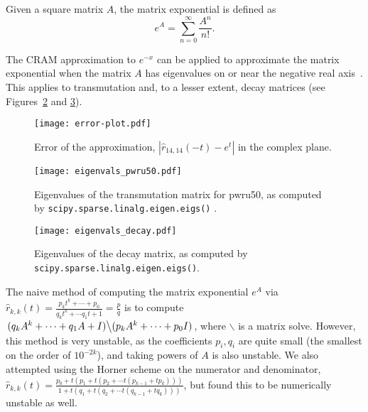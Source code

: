 Given a square matrix $A$, the matrix exponential is defined
as~\cite{ationneeded}
\begin{equation}
  \label{eq:matrix-exponential}
  e^{A} = \sum_{n=0}^\infty \frac{A^n}{n!}.
\end{equation}

The CRAM approximation to $e^{-x}$ can be applied to approximate the matrix
exponential when the matrix $A$ has eigenvalues on or near the negative real
axis~\cite{pusa2010computing}. This applies to transmutation and, to a lesser
extent, decay matrices (see Figures~\ref{fig:eigenvals-pwru50} and
\ref{fig:eigenvals-decay}). 

\begin{figure}[!ht]
\centering
\texttt{[image: error-plot.pdf]}
\caption{Error of the approximation, $\left |\hat{r}_{14,14}(-t) - e^{t}\right
  |$ in the complex plane. }
\label{fig:error-plot}
\end{figure}

\begin{figure}[!ht]
\centering
\texttt{[image: eigenvals\_pwru50.pdf]}
\caption{Eigenvalues of the transmutation matrix for pwru50, as computed by
  \texttt{scipy.\allowbreak{}sparse.\allowbreak{}linalg.\allowbreak{}eigen.\allowbreak{}eigs()}
  .}
\label{fig:eigenvals-pwru50}
\end{figure}

\begin{figure}[!ht]
\centering
\texttt{[image: eigenvals\_decay.pdf]}
\caption{Eigenvalues of the decay matrix, as computed by
  \texttt{scipy.\allowbreak{}sparse.\allowbreak{}linalg.\allowbreak{}eigen.\allowbreak{}eigs()}.}
\label{fig:eigenvals-decay}
\end{figure}


The naive method of computing the matrix exponential $e^A$ via
$\hat{r}_{k, k}(t)=\frac{p_kt^k + \cdots + p_0}{q_kt^k + \cdots q_1t +
  1}=\frac{p}{q}$ is to compute
$\left .(q_kA^k + \cdots + q_1A + I)\middle\backslash(p_kA^k + \cdots + p_0 I)\right.$, where
$\backslash$ is a matrix solve. However, this method is very unstable, as the
coefficients $p_i,q_i$ are quite small (the smallest on the order of
$10^{-2k}$), and taking powers of $A$ is also unstable. We also attempted
using the Horner scheme on the numerator and denominator,
$\hat{r}_{k, k}(t)=\frac{p_0 + t(p_1 + t(p_2 + \cdots t(p_{k-1} + tp_k)))}{1 +
  t(q_1 + t(q_2 + \cdots t(q_{k-1} + tq_k)))}$, but found this to be
numerically unstable as well.

